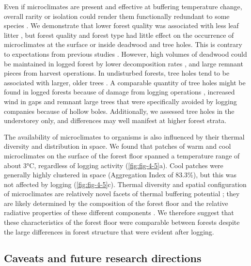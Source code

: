 \documentclass[12pt,a4paper,]{report}
\theoremstyle{definition}
\theoremstyle{definition}
\theoremstyle{definition}
\theoremstyle{remark}
\begin{document}
Even if microclimates are present and effective at buffering temperature
change, overall rarity or isolation could render them functionally
redundant to some species
\citep{sears_world_2011, sears_configuration_2016}. We demonstrate that
lower forest quality was associated with less leaf litter
\citep[\autoref{fig:fig-4-5}; cf.][]{saner_reduced_2009}, but forest
quality and forest type had little effect on the occurrence of
microclimates at the surface or inside deadwood and tree holes. This is
contrary to expectations from previous studies
\citep{ball_tree_1999, blakely_tree_2008}. However, high volumes of
deadwood could be maintained in logged forest by lower decomposition
rates
\citetext{\citealp{ewers_logging_2015}; \citealp{yeong_leaf_2016}; \citealp[but
see][]{herault_modeling_2010}}, and large remnant pieces from harvest
operations. In undisturbed forests, tree holes tend to be associated
with larger, older trees
\citep{lindenmayer_cavity_2000, blakely_tree_2008}. A comparable
quantity of tree holes might be found in logged forests because of
damage from logging operations \citep{edwards_maintaining_2014},
increased wind in gaps \citep{chen_growing-season_1995} and remnant
large trees that were specifically avoided by logging companies because
of hollow boles. Additionally, we assessed tree holes in the understorey
only, and differences may well manifest at higher forest strata.

The availability of microclimates to organisms is also influenced by
their thermal diversity and distribution in space. We found that patches
of warm and cool microclimates on the surface of the forest floor
spanned a temperature range of about 3°C, regardless of logging activity
(\autoref{fig:fig-4-5}a). Cool patches were generally highly clustered
in space (Aggregation Index of 83.3\%), but this was not affected by
logging (\autoref{fig:fig-4-5}c). Thermal diversity and spatial
configuration of microclimates are relatively novel facets of thermal
buffering potential \citep[but
see:][]{caillon_warming_2014, sears_configuration_2016, faye_toolbox_2016};
they are likely determined by the composition of the forest floor and
the relative radiative properties of these different components
\citep[e.g.~bare soil versus leaves versus
water;][]{oke_boundary_1987, snyder_analyzing_2004}. We therefore
suggest that these characteristics of the forest floor were comparable
between forests despite the large differences in forest structure that
were evident after logging.

\subsection{Caveats and future research
directions}\label{caveats-and-future-research-directions}
\end{document}

